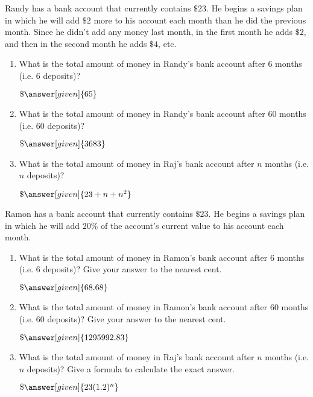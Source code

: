\documentclass[nooutcomes]{ximera}
\begin{document}
\begin{problem}
Randy has a bank account that currently contains $\$23$.  He begins a savings plan in which he will add $\$2$ more to his account each month than he did the previous month.  Since he didn't add any money last month, in the first month he adds $\$2$, and then in the second month he adds $\$4$, etc.  

\begin{enumerate}
\item What is the total amount of money in Randy's bank account after $6$ months (i.e. $6$ deposits)? \begin{prompt} $\$\answer[given]{65}$\end{prompt}
\item What is the total amount of money in Randy's bank account after $60$ months (i.e. $60$ deposits)? \begin{prompt} $\$\answer[given]{3683}$\end{prompt}
\item What is the total amount of money in Raj's bank account after $n$ months (i.e. $n$ deposits)? \begin{prompt} $\$\answer[given]{23+n+n^2}$\end{prompt}
\end{enumerate}
\end{problem}



\begin{problem}
Ramon has a bank account that currently contains $\$23$.  He begins a savings plan in which he will add $20\%$ of the account's current value to his account each month.  

\begin{enumerate}
\item What is the total amount of money in Ramon's bank account after $6$ months (i.e. $6$ deposits)?  Give your answer to the nearest cent. \begin{prompt} $\$\answer[given]{68.68}$\end{prompt}
\item What is the total amount of money in Ramon's bank account after $60$ months (i.e. $60$ deposits)? Give your answer to the nearest cent. \begin{prompt} $\$\answer[given]{1295992.83}$\end{prompt}
\item What is the total amount of money in Raj's bank account after $n$ months (i.e. $n$ deposits)?  Give a formula to calculate the exact answer. \begin{prompt} $\$\answer[given]{23(1.2)^n}$\end{prompt}
\end{enumerate}
\end{problem}
\end{document}
